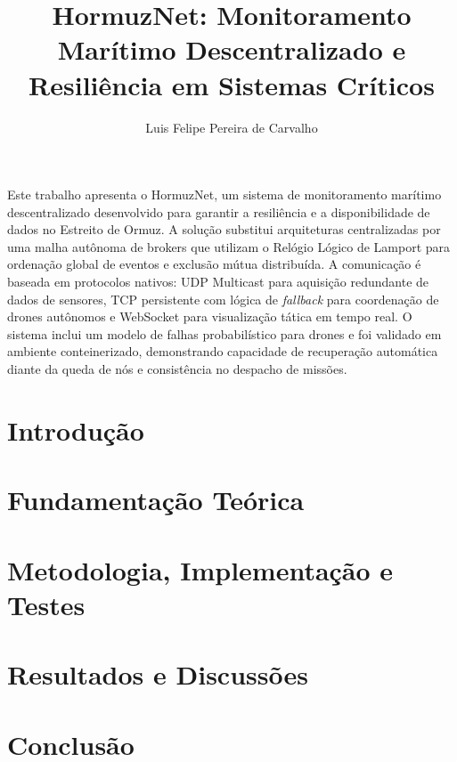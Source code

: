 \documentclass[12pt]{article}
\title{HormuzNet: Monitoramento Marítimo Descentralizado e Resiliência em Sistemas Críticos}
\author{Luis Felipe Pereira de Carvalho\inst{1}}
\begin{document}
\maketitle

\begin{resumo}
Este trabalho apresenta o HormuzNet, um sistema de monitoramento marítimo
descentralizado desenvolvido para garantir a resiliência e a disponibilidade de
dados no Estreito de Ormuz. A solução substitui arquiteturas centralizadas por
uma malha autônoma de brokers que utilizam o Relógio Lógico de Lamport para
ordenação global de eventos e exclusão mútua distribuída. A comunicação é
baseada em protocolos nativos: UDP Multicast para aquisição redundante de dados
de sensores, TCP persistente com lógica de \textit{fallback} para coordenação de
drones autônomos e WebSocket para visualização tática em tempo real. O sistema
inclui um modelo de falhas probabilístico para drones e foi validado em ambiente
conteinerizado, demonstrando capacidade de recuperação automática diante da
queda de nós e consistência no despacho de missões.

\end{resumo}

\section{Introdução}
\label{sec:introducao}


\section{Fundamentação Teórica}
\label{sec:fundamentos}


\section{Metodologia, Implementação e Testes}
\label{sec:metodologia}


\section{Resultados e Discussões}
\label{sec:resultados}


\section{Conclusão}
\label{sec:conclusao}




\end{document}
